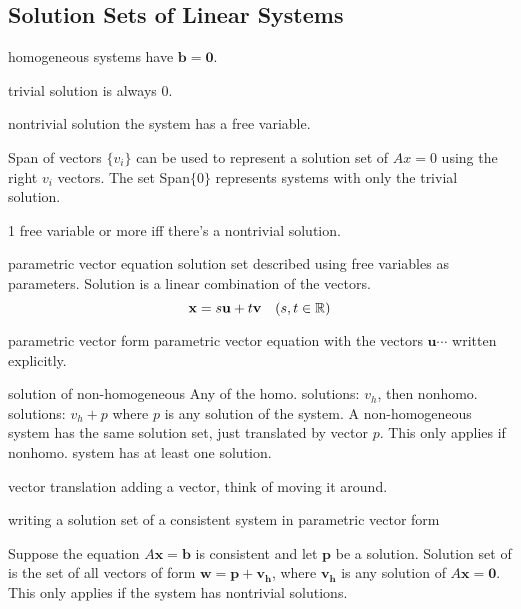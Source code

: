 \begin{card}
    \subsection{Solution Sets of Linear Systems}

    \begin{compactdesc}
    \item[homogeneous] systems have $\bm{b = 0}$.
    \item[trivial solution] is always $0$.
    \item[nontrivial solution] the system has a free variable.
    \item[Span] of vectors $\{v_i\}$ can be used to represent a solution set
        of $Ax = 0$ using the right $v_i$ vectors. The set Span$\{0\}$
        represents systems with only the trivial solution.
    \item[1 free variable] or more iff there's a nontrivial solution.
    \item[parametric vector equation] solution set described using free variables
        as parameters. Solution is a linear combination of the vectors.
        \[
            \mathbf{x} = s\mathbf{u} + t\mathbf{v} \quad (s,t \in \mathbb{R})
        \]
    \item[parametric vector form] parametric vector equation with the vectors
        $\bm{u} \cdots$ written explicitly.
    \item[solution of non-homogeneous]
        Any of the homo. solutions: $v_h$, then nonhomo. solutions: $v_h + p$
        where $p$ is any solution of the system.
        A non-homogeneous system has the same solution set, just translated
        by vector $p$.
        This only applies if nonhomo. system has at least one solution.
    \item[vector translation] adding a vector, think of moving it around.
    \item[writing a solution set] of a consistent system in parametric vector
        form
    \end{compactdesc}

    \begin{theorem}
        Suppose the equation $A\bm{x} = \bm{b}$ is consistent and let $\bm{p}$
        be a solution. Solution set of is the set of all
        vectors of form $\bm{w} = \bm{p} + \bm{v_h}$, where $\bm{v_h}$ is
        any solution of $A\bm{x} = \bm{0}$.
        This only applies if the system has nontrivial solutions.
    \end{theorem}
\end{card}



